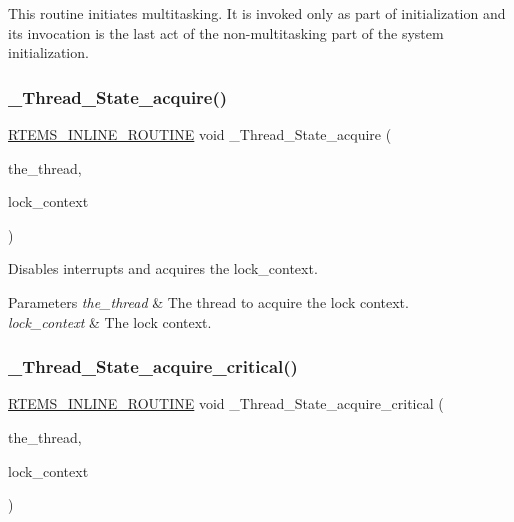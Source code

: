 This routine initiates multitasking. It is invoked only as part of initialization and its invocation is the last act of the non-\/multitasking part of the system initialization. \mbox{\label{group__RTEMSScoreThread_ga9a583864cdcbb7eaeda8002d05de6912}} 
\subsubsection{\texorpdfstring{\_Thread\_State\_acquire()}{\_Thread\_State\_acquire()}}
{\footnotesize\ttfamily \mbox{\hyperlink{group__RTEMSScoreBaseDefs_gac216239df231d5dbd15e3520b0b9313f}{R\+T\+E\+M\+S\+\_\+\+I\+N\+L\+I\+N\+E\+\_\+\+R\+O\+U\+T\+I\+NE}} void \+\_\+\+Thread\+\_\+\+State\+\_\+acquire (\begin{DoxyParamCaption}\item[{\mbox{\hyperlink{struct__Thread__Control}{Thread\+\_\+\+Control}} $\ast$}]{the\+\_\+thread,  }\item[{\mbox{\hyperlink{structISR__lock__Context}{I\+S\+R\+\_\+lock\+\_\+\+Context}} $\ast$}]{lock\+\_\+context }\end{DoxyParamCaption})}



Disables interrupts and acquires the lock\+\_\+context. 


\begin{DoxyParams}{Parameters}
{\em the\+\_\+thread} & The thread to acquire the lock context. \\
\hline
{\em lock\+\_\+context} & The lock context. \\
\hline
\end{DoxyParams}
\mbox{\label{group__RTEMSScoreThread_gafd7ff215edf64b4611da7b7c1d4e3050}} 
\subsubsection{\texorpdfstring{\_Thread\_State\_acquire\_critical()}{\_Thread\_State\_acquire\_critical()}}
{\footnotesize\ttfamily \mbox{\hyperlink{group__RTEMSScoreBaseDefs_gac216239df231d5dbd15e3520b0b9313f}{R\+T\+E\+M\+S\+\_\+\+I\+N\+L\+I\+N\+E\+\_\+\+R\+O\+U\+T\+I\+NE}} void \+\_\+\+Thread\+\_\+\+State\+\_\+acquire\+\_\+critical (\begin{DoxyParamCaption}\item[{\mbox{\hyperlink{struct__Thread__Control}{Thread\+\_\+\+Control}} $\ast$}]{the\+\_\+thread,  }\item[{\mbox{\hyperlink{structISR__lock__Context}{I\+S\+R\+\_\+lock\+\_\+\+Context}} $\ast$}]{lock\+\_\+context }\end{DoxyParamCaption})}



